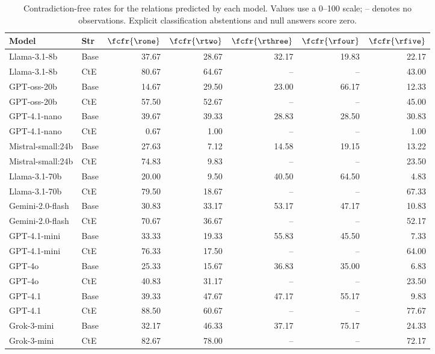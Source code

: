 \begin{table}[!t]
\centering
\scriptsize
\setlength{\tabcolsep}{3pt}
\caption{Contradiction-free rates for the relations predicted by each model. Values use a 0--100 scale; -- denotes no observations. Explicit classification abstentions and null answers score zero.}
\begin{tabular}{llrrrrr}
\toprule
\textbf{Model} & \textbf{Str} & $\fcfr{\rone}$ & $\fcfr{\rtwo}$ & $\fcfr{\rthree}$ & $\fcfr{\rfour}$ & $\fcfr{\rfive}$ \\
\midrule
Llama-3.1-8b & Base & 37.67 & 28.67 & 32.17 & 19.83 & 22.17 \\
Llama-3.1-8b & CtE & 80.67 & 64.67 & -- & -- & 43.00 \\
\midrule
GPT-oss-20b & Base & 14.67 & 29.50 & 23.00 & 66.17 & 12.33 \\
GPT-oss-20b & CtE & 57.50 & 52.67 & -- & -- & 45.00 \\
\midrule
GPT-4.1-nano & Base & 39.67 & 39.33 & 28.83 & 28.50 & 30.83 \\
GPT-4.1-nano & CtE & 0.67 & 1.00 & -- & -- & 1.00 \\
\midrule
Mistral-small:24b & Base & 27.63 & 7.12 & 14.58 & 19.15 & 13.22 \\
Mistral-small:24b & CtE & 74.83 & 9.83 & -- & -- & 23.50 \\
\midrule
Llama-3.1-70b & Base & 20.00 & 9.50 & 40.50 & 64.50 & 4.83 \\
Llama-3.1-70b & CtE & 79.50 & 18.67 & -- & -- & 67.33 \\
\midrule
Gemini-2.0-flash & Base & 30.83 & 33.17 & 53.17 & 47.17 & 10.83 \\
Gemini-2.0-flash & CtE & 70.67 & 36.67 & -- & -- & 52.17 \\
\midrule
GPT-4.1-mini & Base & 33.33 & 19.33 & 55.83 & 45.50 & 7.33 \\
GPT-4.1-mini & CtE & 76.33 & 17.50 & -- & -- & 64.00 \\
\midrule
GPT-4o & Base & 25.33 & 15.67 & 36.83 & 35.00 & 6.83 \\
GPT-4o & CtE & 40.83 & 31.17 & -- & -- & 23.50 \\
\midrule
GPT-4.1 & Base & 39.33 & 47.67 & 47.17 & 55.17 & 9.83 \\
GPT-4.1 & CtE & 88.50 & 60.67 & -- & -- & 77.67 \\
\midrule
Grok-3-mini & Base & 32.17 & 46.33 & 37.17 & 75.17 & 24.33 \\
Grok-3-mini & CtE & 82.67 & 78.00 & -- & -- & 72.17 \\

\end{tabular}
\end{table}
